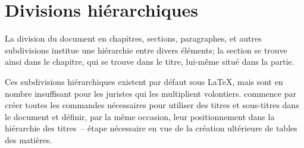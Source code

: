 
\section{Divisions hiérarchiques}



La division du document en chapitres, sections, paragraphes, et autres subdivisions institue une hiérarchie entre divers éléments; la section se trouve ainsi dans le chapitre, qui se trouve dans le titre, lui-même situé dans la partie.

Ces subdivisions hiérarchiques existent par défaut sous \LaTeX, mais sont en nombre insuffisant pour les juristes qui les multiplient volontiers. \frenchlaw commence par créer toutes les commandes nécessaires pour utiliser des titres et sous-titres dans le document et définir, par la même occasion, leur positionnement dans la hiérarchie des titres~-- étape nécessaire en vue de la création ultérieure de tables des matières.

\begin{noprint}
\end{noprint}

\begin{noprint}
\newcommand{\heading}[2][]{
	\begingroup
		\if@article\else\cleardoublepage\fi
		\stepcounter{heading}
		\renewcommand{\printchaptertitle}{%
			\printheadingname%
			\headingnamenum\printheadingnum%
			\afterheadingnum%
			\printheadingtitle%
		}
		\clearforchapter
		\thispagestyle{chapter}
		\@schapter{#2}
		\chaptermark{#2}
		\phantomsection
		\addcontentsline{toc}{heading}{\protect\numberline{\theheading}#2}
	\endgroup
}
\end{noprint}

